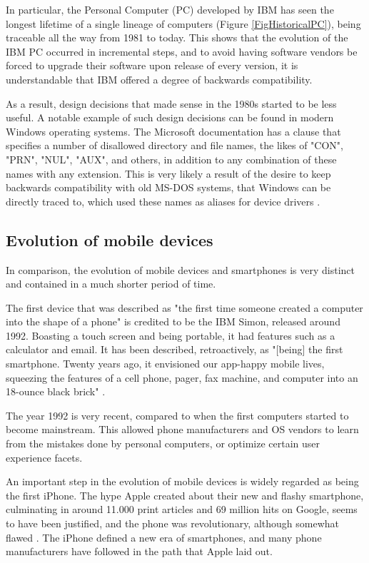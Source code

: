 In particular, the Personal Computer (PC) developed by IBM has seen the longest lifetime of a single lineage of computers (Figure \ref{FigHistoricalPC}), being traceable all the way from 1981 to today. This shows that the evolution of the IBM PC occurred in incremental steps, and to avoid having software vendors be forced to upgrade their software upon release of every version, it is understandable that IBM offered a degree of backwards compatibility.

As a result, design decisions that made sense in the 1980s started to be less useful. A notable example of such design decisions can be found in modern Windows operating systems. The Microsoft documentation \cite{MSDNFolderNaming} has a clause that specifies a number of disallowed directory and file names, the likes of "CON", "PRN", "NUL", "AUX", and others, in addition to any combination of these names with any extension. This is very likely a result of the desire to keep backwards compatibility with old MS-DOS systems, that Windows can be directly traced to, which used these names as aliases for device drivers \cite{HusseinDeviceDrivers}.

\subsection{Evolution of mobile devices}
In comparison, the evolution of mobile devices and smartphones is very distinct and contained in a much shorter period of time.

The first device that was described as "the first time someone created a computer into the shape of a phone" is credited to be the IBM Simon, released around 1992. Boasting a touch screen and being portable, it had features such as a calculator and email. It has been described, retroactively, as "[being] the first smartphone. Twenty years ago, it envisioned our app-happy mobile lives, squeezing the features of a cell phone, pager, fax machine, and computer into an 18-ounce black brick"
\cite{SagerIraHistoryOfPhones}.

The year 1992 is very recent, compared to when the first computers started to become mainstream. This allowed phone manufacturers and OS vendors to learn from the mistakes done by personal computers, or optimize certain user experience facets.

An important step in the evolution of mobile devices is widely regarded as being the first iPhone. The hype Apple created about their new and flashy smartphone, culminating in around 11.000 print articles and 69 million hits on Google, seems to have been justified, and the phone was revolutionary, although somewhat flawed \cite{NYTAppleIPhoneRelease}. The iPhone defined a new era of smartphones, and many phone manufacturers have followed in the path that Apple laid out.

